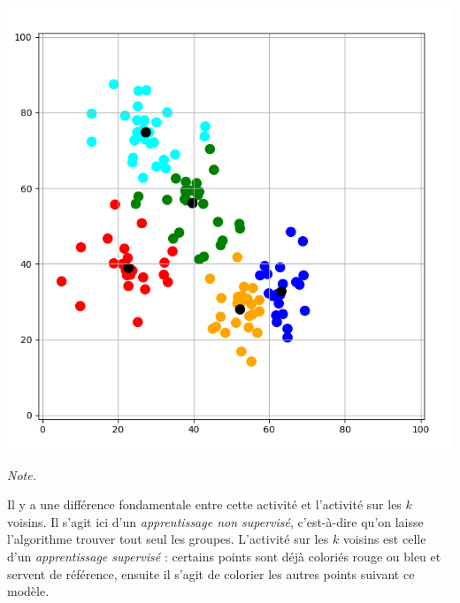 \documentclass[11pt,class=report,crop=false]{standalone}
\begin{document}
\begin{activite}[Barycentres]
\begin{center}
	\includegraphics[scale=\myscale,scale=0.22]{ecran_barycentres_exemple_bis_05}
\end{center}

\bigskip



\emph{Note.} 

Il y a une différence fondamentale entre cette activité et l'activité sur les  $k$ voisins. Il s'agit ici d'un \emph{apprentissage non supervisé}, c'est-à-dire qu'on laisse l'algorithme trouver tout seul les groupes. L'activité sur les $k$ voisins est celle d'un \emph{apprentissage supervisé} : certains points sont déjà coloriés rouge ou bleu et servent de référence, ensuite il s'agit de colorier les autres points suivant ce modèle.


\end{activite}


\bigskip


%
%
%	
%
%
%
\end{document}
